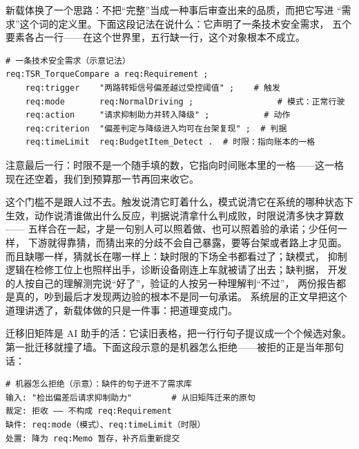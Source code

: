 新载体换了一个思路：不把“完整”当成一种事后审查出来的品质，而把它写进
“需求”这个词的定义里。下面这段记法在说什么：它声明了一条技术安全需求，
五个要素各占一行——在这个世界里，五行缺一行，这个对象根本不成立。

\nopagebreak[4]
\begin{codebox}
\begin{Verbatim}[fontsize=\small,breaklines=true,breakanywhere=true,breaksymbolleft={},breaksymbolright={}]
# 一条技术安全需求（示意记法）
req:TSR_TorqueCompare a req:Requirement ;
    req:trigger    "两路转矩信号偏差越过受控阈值" ;    # 触发
    req:mode       req:NormalDriving ;                 # 模式：正常行驶
    req:action     "请求抑制助力并转入降级" ;           # 动作
    req:criterion  "偏差判定与降级进入均可在台架复现" ;  # 判据
    req:timeLimit  req:BudgetItem_Detect .  # 时限：指向账本的一格
\end{Verbatim}
\end{codebox}

注意最后一行：时限不是一个随手填的数，它指向时间账本里的一格——这一格
现在还空着，我们到预算那一节再回来收它。

这个门槛不是跟人过不去。触发说清它盯着什么，模式说清它在系统的哪种状态下
生效，动作说清谁做出什么反应，判据说清拿什么判成败，时限说清多快才算数——
五样合在一起，才是一句别人可以照着做、也可以照着验的承诺；少任何一样，
下游就得靠猜，而猜出来的分歧不会自己暴露，要等台架或者路上才见面。
而且缺哪一样，猜就长在哪一样上：缺时限的下场全书都看过了；缺模式，
抑制逻辑在检修工位上也照样出手，诊断设备刚连上车就被请了出去；缺判据，
开发的人按自己的理解测完说“好了”，验证的人按另一种理解判“不过”，
两份报告都是真的，吵到最后才发现两边验的根本不是同一句承诺。
系统层的正文早把这个道理讲透了，新载体做的只是一件事：把道理变成门。

迁移旧矩阵是 AI 助手的活：它读旧表格，把一行行句子提议成一个个候选对象。
第一批迁移就撞了墙。下面这段示意的是机器怎么拒绝——被拒的正是当年那句话：

\nopagebreak[4]
\begin{codebox}
\begin{Verbatim}[fontsize=\small,breaklines=true,breakanywhere=true,breaksymbolleft={},breaksymbolright={}]
# 机器怎么拒绝（示意）：缺件的句子进不了需求库
输入: "检出偏差后请求抑制助力"        # 从旧矩阵迁来的原句
裁定: 拒收 —— 不构成 req:Requirement
缺件: req:mode（模式）、req:timeLimit（时限）
处置: 降为 req:Memo 暂存，补齐后重新提交
\end{Verbatim}
\end{codebox}

